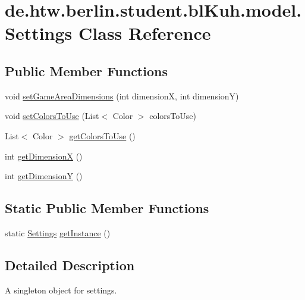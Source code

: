 \hypertarget{classde_1_1htw_1_1berlin_1_1student_1_1bl_kuh_1_1model_1_1_settings}{\section{de.\-htw.\-berlin.\-student.\-bl\-Kuh.\-model.\-Settings Class Reference}
\label{classde_1_1htw_1_1berlin_1_1student_1_1bl_kuh_1_1model_1_1_settings}
}
\subsection*{Public Member Functions}
\begin{DoxyCompactItemize}
\item 
void \hyperlink{classde_1_1htw_1_1berlin_1_1student_1_1bl_kuh_1_1model_1_1_settings_a29999719759e8859463632d58d2051b0}{set\-Game\-Area\-Dimensions} (int dimension\-X, int dimension\-Y)
\item 
void \hyperlink{classde_1_1htw_1_1berlin_1_1student_1_1bl_kuh_1_1model_1_1_settings_a3728c011c35d4f6475d8b06eafb6d1c8}{set\-Colors\-To\-Use} (List$<$ Color $>$ colors\-To\-Use)
\item 
List$<$ Color $>$ \hyperlink{classde_1_1htw_1_1berlin_1_1student_1_1bl_kuh_1_1model_1_1_settings_ae73ab5e1b4bca3a5151d77f049ee5936}{get\-Colors\-To\-Use} ()
\item 
int \hyperlink{classde_1_1htw_1_1berlin_1_1student_1_1bl_kuh_1_1model_1_1_settings_afb5ad53400828d1c6b842c41a6a2f0b9}{get\-Dimension\-X} ()
\item 
int \hyperlink{classde_1_1htw_1_1berlin_1_1student_1_1bl_kuh_1_1model_1_1_settings_a913e9d831f39fed17d128657853e1e4d}{get\-Dimension\-Y} ()
\end{DoxyCompactItemize}
\subsection*{Static Public Member Functions}
\begin{DoxyCompactItemize}
\item 
static \hyperlink{classde_1_1htw_1_1berlin_1_1student_1_1bl_kuh_1_1model_1_1_settings}{Settings} \hyperlink{classde_1_1htw_1_1berlin_1_1student_1_1bl_kuh_1_1model_1_1_settings_a7e478e2ec72eba5a98a81e624c43cd8e}{get\-Instance} ()
\end{DoxyCompactItemize}


\subsection{Detailed Description}
A singleton object for settings.

